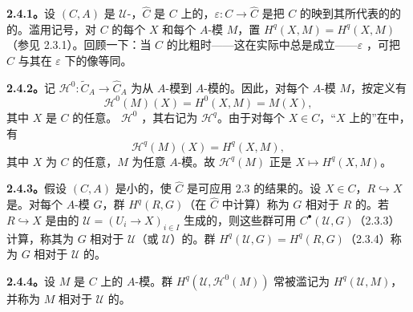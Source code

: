 \textbf{2.4.1。}设 $(C,A)$ 是 $\mathcal U$-，$\widehat C$ 是 $C$ 上的，$\varepsilon:C\to\widehat C$ 是把 $C$ 的映到其所代表的的的。滥用记号，对 $C$ 的每个 $X$ 和每个 $A$-模 $M$，置 $H^q(X,M)=H^q(X,M)$（参见 2.3.1）。回顾一下：当 $C$ 的比粗时——这在实际中总是成立——$\varepsilon$ ，可把 $C$ 与其在 $\varepsilon$ 下的像等同。

\textbf{2.4.2。}记 $\mathscr H^0:\widetilde C_A\to\widehat C_A$ 为从 $A$-模到 $A$-模的。因此，对每个 $A$-模 $M$，按定义有
\[
 \mathscr H^0(M)(X)=H^0(X,M)=M(X),\tag{2.4.2.1}
\]
其中 $X$ 是 $C$ 的任意。 $\mathscr H^0$ ，其右记为 $\mathscr H^q$。由于对每个 $X\in C$，“$X$ 上的”在中，有
\[
 \mathscr H^q(M)(X)=H^q(X,M),\tag{2.4.2.2}
\]
其中 $X$ 为 $C$ 的任意，$M$ 为任意 $A$-模。故 $\mathscr H^q(M)$ 正是 $X\mapsto H^q(X,M)$。

\textbf{2.4.3。}假设 $(C,A)$ 是小的，使 $\widehat C$ 是可应用 2.3 的结果的。设 $X\in C$，$R\hookrightarrow X$ 是。对每个 $A$-模 $G$，群 $H^q(R,G)$（在 $\widehat C$ 中计算）称为 $G$ 相对于 $R$ 的。若 $R\hookrightarrow X$ 是由的 $\mathcal U=(U_i\to X)_{i\in I}$ 生成的，则这些群可用 $C^\bullet(\mathcal U,G)$（2.3.3）计算，称其为 $G$ 相对于 $\mathcal U$（或 $\mathcal U$）的。群 $H^q(\mathcal U,G)=H^q(R,G)$（2.3.4）称为 $G$ 相对于 $\mathcal U$ 的。

\textbf{2.4.4。}设 $M$ 是 $C$ 上的 $A$-模。群 $H^q(\mathcal U,\mathscr H^0(M))$ 常被滥记为 $H^q(\mathcal U,M)$，并称为 $M$ 相对于 $\mathcal U$ 的。

